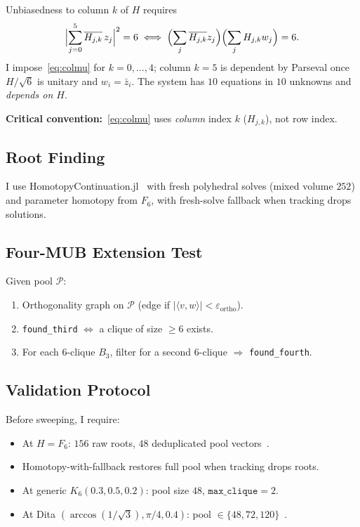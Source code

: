 \documentclass[onecolumn]{IEEEtran}
\begin{document}
Unbiasedness to column $k$ of $H$ requires
\begin{equation}
    \label{eq:colmu}
    \Bigl|\sum_{j=0}^{5}\overline{H_{j,k}}\,z_j\Bigr|^2=6
    \;\Longleftrightarrow\;
    \Bigl(\sum_{j}\overline{H_{j,k}}z_j\Bigr)\Bigl(\sum_{j}H_{j,k}w_j\Bigr)=6.
\end{equation}
I impose~\eqref{eq:colmu} for $k=0,\ldots,4$; column $k=5$ is dependent by Parseval once $H/\sqrt{6}$ is unitary and $w_i=\bar z_i$.
The system has $10$ equations in $10$ unknowns and \emph{depends on $H$}.

\textbf{Critical convention:}~\eqref{eq:colmu} uses \emph{column} index $k$ ($H_{j,k}$), not row index.

\subsection{Root Finding}
I use HomotopyContinuation.jl~\cite{HomotopyContinuation} with fresh polyhedral solves (mixed volume $252$) and parameter homotopy from $F_6$, with fresh-solve fallback when tracking drops solutions.

\subsection{Four-MUB Extension Test}
Given pool $\mathcal{P}$:
\begin{enumerate}
    \item Orthogonality graph on $\mathcal{P}$ (edge if $|\langle v,w\rangle|<\varepsilon_{\mathrm{ortho}}$).
    \item \texttt{found\_third} $\Leftrightarrow$ a clique of size $\ge6$ exists.
    \item For each $6$-clique $B_3$, filter for a second $6$-clique $\Rightarrow$ \texttt{found\_fourth}.
\end{enumerate}

\subsection{Validation Protocol}
Before sweeping, I require:
\begin{itemize}
    \item[\textbf{V1}] At $H=F_6$: $156$ raw roots, $48$ deduplicated pool vectors~\cite{Haagerup2001, Bjork2015}.
    \item[\textbf{V2}] Homotopy-with-fallback restores full pool when tracking drops roots.
    \item[\textbf{V3}] At generic $K_6(0.3,0.5,0.2)$: pool size $48$, $\texttt{max\_clique}=2$.
    \item[\textbf{V4}] At Dita $(\arccos(1/\sqrt{3}),\pi/4,0.4)$: pool $\in\{48,72,120\}$~\cite{Brierley2009}.
\end{itemize}
\end{document}
